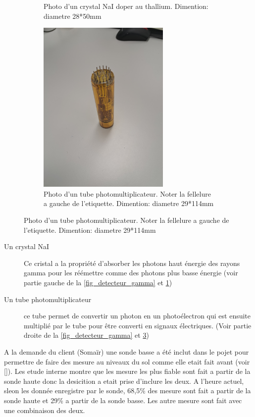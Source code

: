 \begin{figure}
\begin{subfigure}{0.45\textwidth}
        \caption[Photo d'un crystal NaI]{Photo d'un crystal NaI doper au thallium. Dimention: diametre 28*50mm}
        \label{fig_Nai}
    \end{subfigure}
    \begin{subfigure}{0.45\textwidth}
        \centering
        \includegraphics[width=0.7\textwidth]{img/photo/PMT.jpg}
        \caption[Photo d'un tube photomultiplicateur]{Photo d'un tube photomultiplicateur. Noter la fellelure a gauche de l'etiquette. Dimention: diametre 29*114mm}
        \label{fig_PMT}
    \end{subfigure}
\end{figure}
\begin{description}
    \item[Un crystal NaI] Ce cristal a la propriété d'absorber les photons haut énergie des rayons gamma pour les réémettre comme des photons plus basse énergie (voir partie gauche de la \cref{fig_detecteur_gamma} et \cref{fig_Nai})~\cite{site:explication_NaI}
    \item[Un tube photomultiplicateur] ce tube permet de convertir un photon en un photoélectron qui est ensuite multiplié par le tube pour être converti en signaux électriques. (Voir partie droite de la \cref{fig_detecteur_gamma} et \cref{fig_PMT})~\cite{site:explication_NaI}
\end{description}
A la demande du client (Somaïr) une sonde basse a été inclut dans le pojet pour permettre de faire des mesure au niveaux du sol comme elle etait fait avant (voir \ref{}). %
Les etude interne montre que les mesure les plus fiable sont fait a partir de la sonde haute donc la desicition a etait prise d'inclure les deux. A l'heure actuel, sleon les donnée enregistre par le sonde, 68,5\% des mesure sont fait a partir de la sonde haute et 29\% a partir de la sonde basse. Les autre mesure sont fait avec une combinaison des deux.

